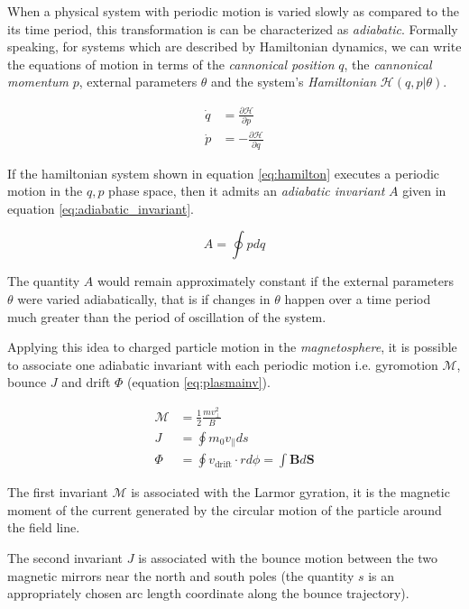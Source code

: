 When a physical system with periodic motion is varied slowly as compared to the its time period, this 
transformation is can be characterized as \emph{adiabatic}. Formally speaking, for systems which are described by 
Hamiltonian dynamics, we can write the equations of motion in terms of the \emph{cannonical position} $q$, 
the \emph{cannonical momentum} $p$, external parameters $\theta$ and the system's \emph{Hamiltonian} 
$\mathcal{H}(q,p|\theta)$. 

\begin{align}\label{eq:hamilton}
    \dot q &= \frac{\partial \mathcal{H}}{\partial p}\\
    \dot p &= - \frac{\partial \mathcal{H}}{\partial q}
\end{align}

If the hamiltonian system shown in equation \ref{eq:hamilton} executes a periodic motion in the $q,p$ phase space, 
then it admits an \emph{adiabatic invariant} $A$ given in equation \ref{eq:adiabatic_invariant}.

\begin{equation}\label{eq:adiabatic_invariant}
    A = \oint p dq
\end{equation}

The quantity $A$ would remain approximately constant if the external parameters $\theta$ were varied adiabatically, 
that is if changes in $\theta$ happen over a time period much greater than the period of oscillation of the system.

Applying this idea to charged particle motion in the \emph{magnetosphere}, it is possible to associate one 
adiabatic invariant with each periodic motion i.e. gyromotion $\mathcal{M}$, bounce $J$ and drift 
$\Phi$ (equation \ref{eq:plasmainv}). 

\begin{align}\label{eq:plasmainv}
    \mathcal{M} &= \frac{1}{2}\frac{mv^{2}_{\perp}}{B} \\
    J &= \oint{m_0 v_{\parallel}ds} \\
    \Phi &= \oint{v_{\text{drift}} \cdot r d\phi} = \int{\mathbf{B} d\mathbf{S}}
\end{align}


The first invariant $\mathcal{M}$ is associated with the Larmor gyration, it is the magnetic moment of the 
current generated by the circular motion of the particle around the field line. 

The second invariant $J$ is associated with the bounce motion between the two magnetic mirrors near the north and 
south poles (the quantity $s$ is an appropriately chosen arc length coordinate along the bounce trajectory). 

